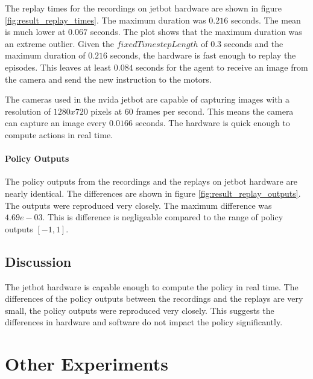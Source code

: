 The replay times for the recordings on jetbot hardware are shown in figure \ref{fig:result_replay_times}. The maximum duration was $0.216$ seconds. The mean is much lower at $0.067$ seconds. The plot shows that the maximum duration was an extreme outlier.
Given the $fixedTimestepLength$ of $0.3$ seconds and the maximum duration of $0.216$ seconds, the hardware is fast enough to replay the episodes. This leaves at least $0.084$ seconds for the agent to receive an image from the camera and send the new instruction to the motors.

The cameras used in the nvida jetbot are capable of capturing images with a resolution of $1280x720$ pixels at $60$ frames per second. This means the camera can capture an image every $0.0166$ seconds. The hardware is quick enough to compute actions in real time.


\paragraph{Policy Outputs}

The policy outputs from the recordings and the replays on jetbot hardware are nearly identical. The differences are shown in figure \ref{fig:result_replay_outputs}. The outputs were reproduced very closely. The maximum difference was $4.69e-03$.  This is difference is negligeable compared to the range of policy outputs $[-1,1]$.


\subsection{Discussion}

The jetbot hardware is capable enough to compute the policy in real time. The differences of the policy outputs between the recordings and the replays are very small, the policy outputs were reproduced very closely. This suggests the differences in hardware and software do not impact the policy significantly.

\section{Other Experiments}

